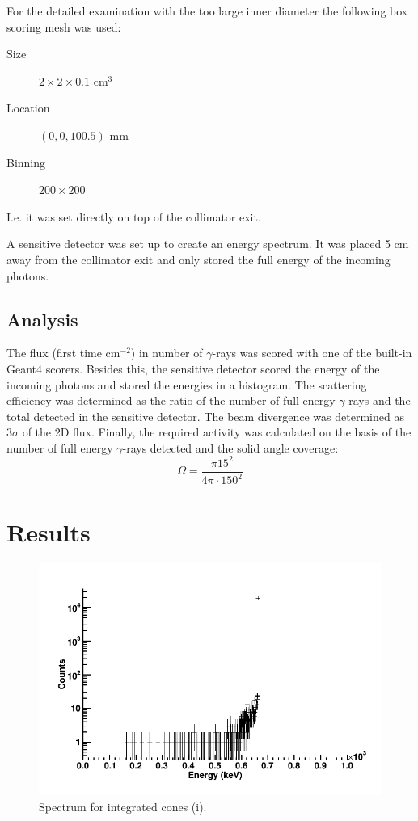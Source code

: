 \documentclass[a4paper]{article}
\begin{document}
For the detailed examination with the too large inner diameter the following box scoring mesh was used:
\begin{description}
  \item[Size] $2\times2\times0.1$ cm$^3$
  \item[Location] $(0, 0, 100.5)$ mm
  \item[Binning] $200\times200$
\end{description}
I.e. it was set directly on top of the collimator exit.

A sensitive detector was set up to create an energy spectrum. It was placed 5 cm away from the collimator exit and only stored the full energy of the incoming photons.

\subsection{Analysis}
The flux (first time cm$^{-2}$) in number of $\gamma$-rays was scored with one of the built-in Geant4 scorers. Besides this, the sensitive detector scored the energy of the incoming photons and stored the energies in a histogram.
The scattering efficiency was determined as the ratio of the number of full energy $\gamma$-rays and the total detected in the sensitive detector. The beam divergence was determined as $3\sigma$ of the 2D flux. Finally, the required activity was calculated on the basis of the number of full energy $\gamma$-rays detected and the solid angle coverage:
\begin{equation}
  \Omega = \frac{\pi 15^2}{4\pi \cdot 150^2}
  \label{eq:solid_angle}
\end{equation}

\section{Results}
\begin{figure}[H]
  \centering
  \includegraphics[width=\textwidth]{spec.png}
  \caption{Spectrum for integrated cones (i).}
  \label{fig:spec}
\end{figure}
\end{document}
